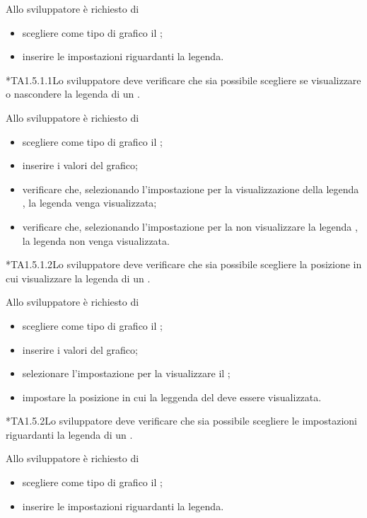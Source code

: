 		Allo sviluppatore è richiesto di
		\begin{itemize}
			\item scegliere come tipo di grafico il ;
			\item inserire le impostazioni riguardanti la legenda.
		\end{itemize}

	*{TA1.5.1.1}Lo sviluppatore deve verificare che sia possibile scegliere se visualizzare o nascondere la legenda di un .
			
		Allo sviluppatore è richiesto di
		\begin{itemize}
			\item scegliere come tipo di grafico il ;
			\item inserire i valori del grafico;
			\item verificare che, selezionando l'impostazione per la visualizzazione della legenda , la legenda venga visualizzata;
			\item verificare che, selezionando l'impostazione per la non visualizzare la legenda , la legenda non venga visualizzata.
		\end{itemize}

	*{TA1.5.1.2}Lo sviluppatore deve verificare che sia possibile scegliere la posizione in cui visualizzare la legenda di un .
			
		Allo sviluppatore è richiesto di
		\begin{itemize}
			\item scegliere come tipo di grafico il ;
			\item inserire i valori del grafico;
			\item selezionare l'impostazione per la visualizzare il ;
			\item impostare la posizione in cui la leggenda del  deve essere visualizzata.

		\end{itemize}

	*{TA1.5.2}Lo sviluppatore deve verificare che sia possibile scegliere le impostazioni riguardanti la legenda di un .

		Allo sviluppatore è richiesto di
		\begin{itemize}
			\item scegliere come tipo di grafico il ;
			\item inserire le impostazioni riguardanti la legenda.
		\end{itemize}

